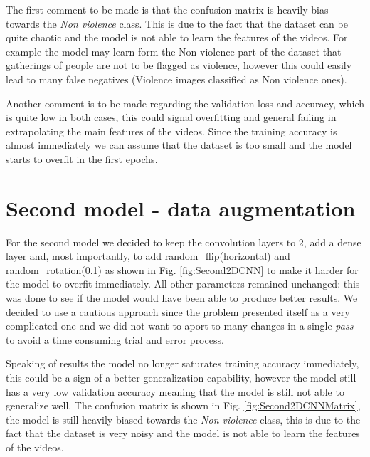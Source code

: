 The first comment to be made is that the confusion matrix is heavily bias towards the \textit{Non violence} class. This is due to the fact that the dataset can be quite chaotic and the model is not able to learn the features of the videos. For example the model may learn form the Non violence part of the dataset that gatherings of people are not to be flagged as violence, however this could easily lead to many false negatives (Violence images classified as Non violence ones).

Another comment is to be made regarding the validation loss and accuracy, which is quite low in both cases, this could signal overfitting and general failing in extrapolating the main features of the videos. Since the training accuracy is almost immediately we can assume that the dataset is too small and the model starts to overfit in the first epochs.
\pagebreak
\section{Second model - data augmentation}
For the second model we decided to keep the convolution layers to 2, add a dense layer and, most importantly, to add random\_flip(horizontal) and random\_rotation(0.1)  as shown in Fig. \ref{fig:Second2DCNN} to make it harder for the model to overfit immediately. All other parameters remained unchanged: this was done to see if the model would have been able to produce better results. 
We decided to use a cautious approach since the problem presented itself as a very complicated one and we did not want to aport to many changes in a single \textit{pass} to avoid a time consuming trial and error process. 

Speaking of results the model no longer saturates training accuracy immediately, this could be a sign of a better generalization capability, however the model still has a very low validation accuracy meaning that the model is still not able to generalize well. The confusion matrix is shown in Fig. \ref{fig:Second2DCNNMatrix}, the model is still heavily biased towards the \textit{Non violence} class, this is due to the fact that the dataset is very noisy and the model is not able to learn the features of the videos.

